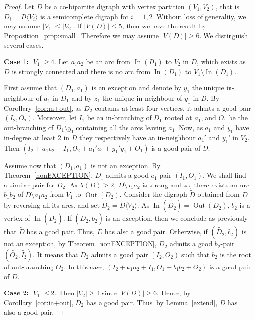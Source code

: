 \documentclass{article}
\theoremstyle{definition}
\DeclareMathOperator{\Out}{Out}
\DeclareMathOperator{\In}{In}
\newcommand{\2}{\vspace{0.2cm}}
\begin{document}
\begin{proof}
Let $D$ be a co-bipartite digraph with vertex partition $(V_1,V_2)$,
that is $D_i=D\langle V_i\rangle$ is a semicomplete digraph for
$i=1,2$.  Without loss of generality, we may assume $|V_1|\leq |V_2|$.
If $|V(D)|\leq 5$, then we have the result by
Proposition~\ref{prop:small}.  Therefore we may assume $|V(D)|\geq 6$.
We distinguish several cases.

{\bf Case 1:} $|V_1|\ge 4$. Let $a_1a_2$ be an arc from $\In(D_1)$ to
$V_2$ in $D$, which exists as $D$ is strongly connected and there is
no arc from $\In(D_1)$ to $V_1\setminus \In(D_1)$.

First assume that $(D_1,a_1)$ is an exception and denote by $y_1$ the
unique in-neighbour of $a_1$ in $D_1$ and by $z_1$ the unique
in-neighbour of $y_1$ in $D$. By Corollary~\ref{cor:in+out}, as
$D_2$ contains at least four vertices, it admits a good pair
$(I_2,O_2)$. Moreover, let $I_1$ be an in-branching of $D_1$ rooted at
$a_1$, and $O_1$ be the out-branching of $D_1\setminus y_1$ containing
all the arcs leaving $a_1$. Now, as $a_1$ and $y_1$ have in-degree at
least 2 in $D$ they respectively have an in-neighbour $a_1'$ and
$y_1'$ in $V_2$.  Then $(I_2 +a_1a_2 + I_1,O_2+a_1'a_1+y_1'y_1+ O_1)$
is a good pair of $D$.

 Assume now that $(D_1,a_1)$ is not an exception. By
 Theorem~\ref{nonEXCEPTION}, $D_1$ admits a good $a_1$-pair
 $(I_1,O_1)$. We shall find a similar pair for $D_2$. As
 $\lambda(D)\ge 2$, $D\setminus a_1a_2$ is strong and so, there exists
 an arc $b_1b_2$ of $D\setminus a_1a_2$ from $V_1$ to $\Out(D_2)$.
 Consider the digraph $\tilde{D}$ obtained from $D$ by reversing all
 its arcs, and set $\tilde{D_2} = \tilde{D}\langle V_2\rangle$. As
 $\In(\tilde{D_2})=\Out(D_2)$, $b_2$ is a vertex of
 $\In(\tilde{D_2})$. If $(\tilde{D_2}, b_2)$ is an exception, then we
 conclude as previously that $\tilde{D}$ has a good pair. Thus, $D$
 has also a good pair. Otherwise, if $(\tilde{D_2}, b_2)$ is not an
 exception, by Theorem~\ref{nonEXCEPTION}, $\tilde{D_2}$ admits a good
 $b_2$-pair $(\tilde{O_2},\tilde{I_2})$. It means that $D_2$ admits a
 good pair $(I_2,O_2)$ such that $b_2$ is the root of out-branching
 $O_2$. In this case, $(I_2+a_1a_2+ I_1, O_1+b_1b_2+ O_2)$ is a
 good pair of $D$.


{\bf Case 2:} $|V_1|\le 2$.
 Then $|V_2|\geq 4$ since $|V(D)|\geq 6$.
Hence, by Corollary~\ref{cor:in+out}, $D_2$ has a good pair.
Thus, by Lemma~\ref{extend}, $D$ has also a good pair.



\end{proof}
\end{document}
